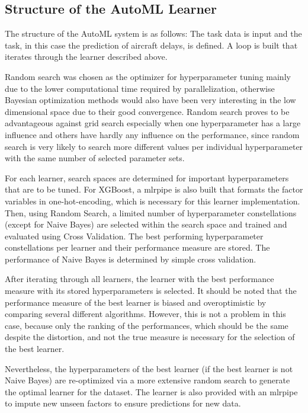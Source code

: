 \documentclass{article}
\begin{document}
\subsection{Structure of the AutoML Learner}
The structure of the AutoML system is as follows: The task data is input and the task, in this case the prediction of aircraft delays, is defined. A loop is built that iterates through the learner described above. 

Random search was chosen as the optimizer for hyperparameter tuning mainly due to the lower computational time required by parallelization, otherwise Bayesian optimization methods would also have been very interesting in the low dimensional space due to their good convergence. Random search proves to be advantageous against grid search especially when one hyperparameter has a large influence and others have hardly any influence on the performance, since random search is very likely to search more different values per individual hyperparameter with the same number of selected parameter sets.

For each learner, search spaces are determined for important hyperparameters that are to be tuned. For XGBoost, a mlrpipe is also built that formats the factor variables in one-hot-encoding, which is necessary for this learner implementation. Then, using Random Search, a limited number of hyperparameter constellations (except for Naive Bayes) are selected within the search space and trained and evaluated using Cross Validation. The best performing hyperparameter constellations per learner and their performance measure are stored. The performance of Naive Bayes is determined by simple cross validation.

After iterating through all learners, the learner with the best performance measure with its stored hyperparameters is selected. It should be noted that the performance measure of the best learner is biased and overoptimistic by comparing several different algorithms. However, this is not a problem in this case, because only the ranking of the performances, which should be the same despite the distortion, and not the true measure is necessary for the selection of the best learner.

Nevertheless, the hyperparameters of the best learner (if the best learner is not Naive Bayes) are re-optimized via a more extensive random search to generate the optimal learner for the dataset. The learner is also provided with an mlrpipe to impute new unseen factors to ensure predictions for new data.
\end{document}
